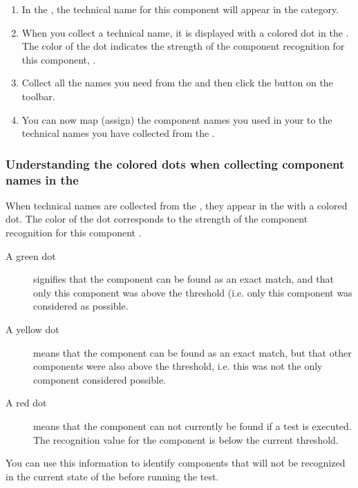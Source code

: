 \begin{enumerate}
\item In the \gdomeditor{}, the technical name for this component will appear in the  category. 
\item When you collect a technical name, it is displayed with a colored dot in the \gdomeditor{}. The color of the dot indicates the strength of the component recognition for this component,  .
\item Collect all the names you need from the \gdaut{} and then click the  button on the toolbar. 
\item You can now map (assign) the component names you used in your \gdcases{} to the technical names you have collected from the \gdaut{} .
\end{enumerate}


\subsubsection{Understanding the colored dots when collecting component names in the \gdomeditor{}}
\label{TasksOMStateColor}

When technical names are collected from the \gdaut{}, they appear in the \gdomeditor{} with a colored dot. The color of the dot corresponds to the strength of the component recognition for this component . 

\begin{description}
\item [A green dot]{signifies that the component can be found as an exact match, and that only this component was above the threshold  (i.e. only this component was considered as possible.}
\item [A yellow dot]{means that the component can be found as an exact match, but that other components were also above the threshold, i.e. this was not the only component considered possible.}
\item [A red dot]{means that the component can not currently be found if a test is executed. The recognition value for the component is below the current threshold.}
\end{description}

You can use this information to identify components that will not be recognized in the current state of the \gdaut{} before running the test. 

